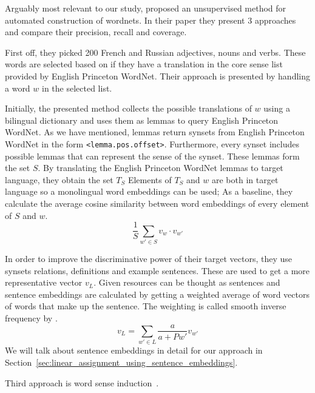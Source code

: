 Arguably most relevant to our study, \textcite{khodak_automated_2017} proposed an unsupervised method for automated construction of wordnets.
In their paper  they present 3 approaches and compare their precision, recall and coverage.

First off, they picked 200 French and Russian adjectives, nouns and verbs.
These words are selected based on if they have a translation in the core sense list provided by English Princeton WordNet.
Their approach is presented by handling a word $w$ in the selected list.

Initially, the presented method collects the possible translations of $w$ using a bilingual dictionary and uses them as lemmas to query English Princeton WordNet.
As we have mentioned, lemmas return synsets from English Princeton WordNet in the form \texttt{<lemma.pos.offset>}.
Furthermore, every synset includes possible lemmas that can represent the sense of the synset.
These lemmas form the set $S$.
By translating the English Princeton WordNet lemmas to target language, they obtain the set $T_S$
Elements of $T_S$ and $w$ are both in target language so a monolingual word embeddings can be used;
As a baseline, they calculate the average cosine similarity between word embeddings of every element of $S$ and $w$.
\begin{displaymath}
    \frac{1}{S}\sum_{w' \in S}v_{w} \cdot v_{w'}
\end{displaymath}

In order to improve the discriminative power of their target vectors, they use synsets relations, definitions and example sentences.
These are used to get a more representative vector $v_{L}$.
Given resources can be thought as sentences and sentence embeddings are calculated by getting a weighted average of word vectors of words that make up the sentence.
The weighting is called smooth inverse frequency by \textcite{arora_simple_2016}.
\begin{displaymath}
    v_{L} = \sum_{w' \in L}\frac{a}{a + P{w'}}v_{w'}
\end{displaymath}
We will talk about sentence embeddings in detail for our approach in Section~\ref{sec:linear_assignment_using_sentence_embeddings}.

Third approach is word sense induction~\cite{arora_linear_2018}.

